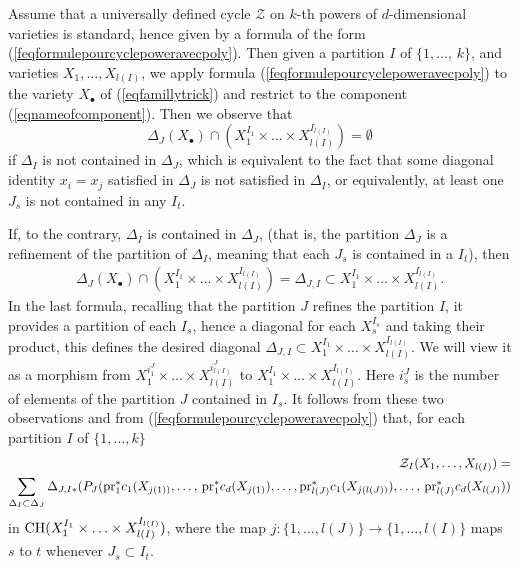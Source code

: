 \documentclass[10pt]{article}
\begin{document}
Assume that a universally defined cycle $\mathcal{Z}$ on $k$-th powers of $d$-dimensional varieties is standard, hence given by a formula  of the form (\ref{feqformulepourcyclepoweravecpoly}).
Then given a partition $I$ of $\{1,\ldots,\,k\}$,
and varieties ${X}_1,\ldots,{X}_{l(I)}$, we apply formula
(\ref{feqformulepourcyclepoweravecpoly}) to the variety $X_\bullet$
of (\ref{eqfamillytrick}) and restrict to the component (\ref{eqnameofcomponent}).
Then we observe that $$\Delta_J(X_\bullet)\cap  ({X}_1^{I_1}\times\ldots\times {X}_{l(I)}^{I_{l(I)}})=\emptyset$$  if $\Delta_I$ is not  contained in $\Delta_J$,  which is equivalent to the fact that some diagonal identity $x_i=x_j$ satisfied  in $\Delta_J$ is not satisfied in $\Delta_I$, or equivalently, at least one
 $J_s$ is not contained in any $I_t$.

  If, to the contrary,  $\Delta_I$ is contained in $\Delta_J$, (that is, the partition $\Delta_J$ is a refinement of the partition of
$\Delta_I$, meaning that each $J_s$ is contained in a $I_t$), then \begin{eqnarray}
\label{eqdefiDelataIJ}
\Delta_J({X}_\bullet)\cap ({X}_1^{I_1}\times\ldots\times {X}_{l(I)}^{I_{l(I)}})=\Delta_{J,I}\subset {X}_1^{I_1}\times\ldots\times {X}_{l(I)}^{I_{l(I)}}.
\end{eqnarray}
In the last formula, recalling that the partition $J$ refines the partition $I$, it provides a partition of each $I_s$, hence a diagonal for each $X_s^{I_s}$ and taking their product,  this  defines  the desired
diagonal $\Delta_{J,I}\subset X_1^{I_1}\times\ldots\times {X}_{l(I)}^{I_{l(I)}}$. We will view it as   a morphism from
$X_1^{i^J_1}\times\ldots\times X_{l(I)}^{i^J_{l(I)}}$
 to $X_1^{I_1}\times\ldots\times X_{l(I)}^{I_{l(I)}}$. Here $i^J_s$ is the number of elements of the partition $J$ contained in $I_s$.
  It follows from these two observations and from (\ref{feqformulepourcyclepoweravecpoly}) that, for each partition $I$ of $\{1,\ldots,k\}$
\begin{eqnarray}\label{eqnew33}\mathcal{Z}_I(X_1,\ldots,X_{l(I)})=
\\
\nonumber
\sum_{\Delta_I\subset \Delta_J}\Delta_{J,I*}(P_J({\rm pr}_1^*c_1(X_{j(1))},\ldots,\,{\rm pr}_1^*c_d(X_{j(1)}),\ldots, {\rm pr}_{l(J)}^*c_1(X_{j(l(J))}),\ldots,\,{\rm pr}_{l(J)}^*c_d(X_{l(J)}) )
\end{eqnarray}
in ${\rm CH}(X_1^{I_1}\times\ldots\times X_{l(I)}^{I_{l(I)}})$, where the map $j:\{1,\ldots,l(J)\}\rightarrow  \{1,\ldots,l(I)\}$ maps $s$ to $t$ whenever
$J_s\subset I_t$.
\end{document}
